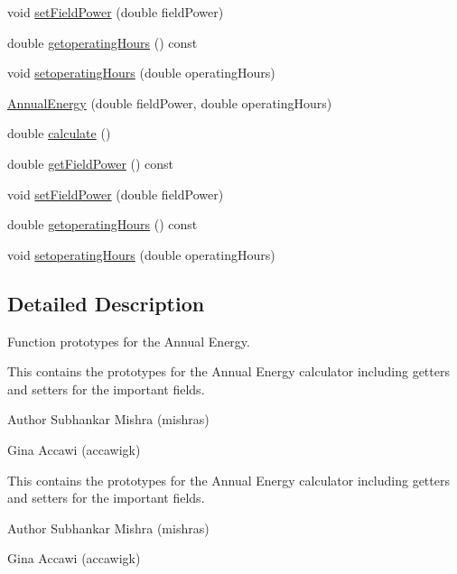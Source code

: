 \begin{DoxyCompactItemize}
\item 
void \hyperlink{class_annual_energy_a4f7212fcf2f6fcd2b12f36ca26a368a1}{set\+Field\+Power} (double field\+Power)
\item 
double \hyperlink{class_annual_energy_a86a176d57507c7be77d0ead5f794af28}{getoperating\+Hours} () const
\item 
void \hyperlink{class_annual_energy_a803812f06ca88aca8a02601930e870cf}{setoperating\+Hours} (double operating\+Hours)
\item 
\hyperlink{class_annual_energy_adb693a67965b0ff46436ee5141ab356d}{Annual\+Energy} (double field\+Power, double operating\+Hours)
\item 
double \hyperlink{class_annual_energy_ab599860ffb32ce20a1042a3e9d2ad57f}{calculate} ()
\item 
double \hyperlink{class_annual_energy_a52aa52274243f578ea7f92d27707cacb}{get\+Field\+Power} () const
\item 
void \hyperlink{class_annual_energy_a4f7212fcf2f6fcd2b12f36ca26a368a1}{set\+Field\+Power} (double field\+Power)
\item 
double \hyperlink{class_annual_energy_a86a176d57507c7be77d0ead5f794af28}{getoperating\+Hours} () const
\item 
void \hyperlink{class_annual_energy_a803812f06ca88aca8a02601930e870cf}{setoperating\+Hours} (double operating\+Hours)
\end{DoxyCompactItemize}


\subsection{Detailed Description}
Function prototypes for the Annual Energy. 

This contains the prototypes for the Annual Energy calculator including getters and setters for the important fields.

\begin{DoxyAuthor}{Author}
Subhankar Mishra (mishras) 

Gina Accawi (accawigk) 
\end{DoxyAuthor}


This contains the prototypes for the Annual Energy calculator including getters and setters for the important fields.

\begin{DoxyAuthor}{Author}
Subhankar Mishra (mishras) 

Gina Accawi (accawigk) 
\end{DoxyAuthor}


